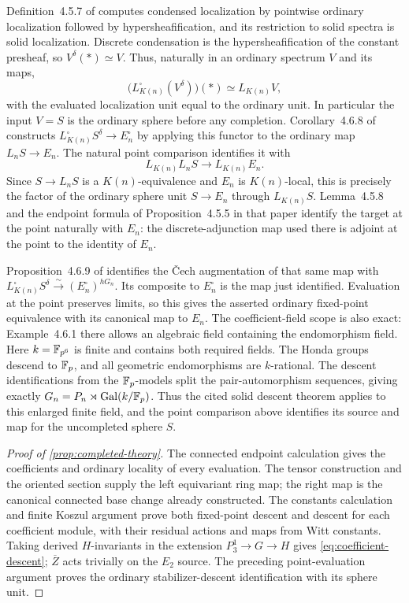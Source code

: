 Definition~4.5.7 of \cite{BMR2026} computes condensed localization by
pointwise ordinary localization followed by hypersheafification, and its
restriction to solid spectra is solid localization. Discrete condensation
is the hypersheafification of the constant presheaf, so
\(V^\delta(*)\simeq V\). Thus, naturally in an ordinary spectrum \(V\)
and its maps,
\[
 \bigl(L_{K(n)}^\square(V^\delta)\bigr)(*)\simeq L_{K(n)}V,
\]
with the evaluated localization unit equal to the ordinary unit.
In particular the input \(V=S\) is the ordinary sphere before any
completion. Corollary~4.6.8 of \cite{BMR2026} constructs
\(L_{K(n)}^\square S^\delta\to E_n^\square\) by applying this functor
to the ordinary map \(L_nS\to E_n\). The natural point comparison
identifies it with
\[
 L_{K(n)}L_nS\longrightarrow L_{K(n)}E_n.
\]
Since \(S\to L_nS\) is a \(K(n)\)-equivalence and \(E_n\) is
\(K(n)\)-local, this is precisely the factor of the ordinary sphere
unit \(S\to E_n\) through \(L_{K(n)}S\). Lemma~4.5.8 and the endpoint
formula of Proposition~4.5.5 in that paper identify the target at the
point naturally with \(E_n\): the discrete-adjunction map used there is
adjoint at the point to the identity of \(E_n\).

Proposition~4.6.9 of \cite{BMR2026} identifies the \v Cech augmentation
of that same map with
\(L_{K(n)}^\square S^\delta\xrightarrow{\sim}(E_n^\square)^{hG_n}\).
Its composite to \(E_n^\square\) is the map just identified. Evaluation
at the point preserves limits, so this gives the asserted ordinary
fixed-point equivalence with its canonical map to \(E_n\).
The coefficient-field scope is also exact: Example~4.6.1 there allows an
algebraic field containing the endomorphism field. Here
\(k=\mathbb F_{p^6}\) is finite and contains both required fields. The Honda
groups descend to \(\mathbb F_p\), and all geometric endomorphisms are
\(k\)-rational. The descent identifications from the \(\mathbb F_p\)-models split
the pair-automorphism sequences, giving exactly
\(G_n=P_n\rtimes\operatorname{Gal}(k/\mathbb F_p)\). Thus the cited solid descent theorem
applies to this enlarged finite field, and the point comparison above
identifies its source and map for the uncompleted sphere \(S\).

\begin{proof}[Proof of \cref{prop:completed-theory}]
The connected endpoint calculation gives the coefficients and ordinary
locality of every evaluation. The tensor construction and the oriented
section supply the left equivariant ring map; the right map is the
canonical connected base change already constructed.
The constants calculation and finite Koszul
argument prove both fixed-point descent and descent for each coefficient
module, with their residual actions and maps from Witt constants.
Taking derived \(H\)-invariants in the extension
\(P_3^1\to G\to H\) gives \eqref{eq:coefficient-descent};
\(\overline Z\) acts trivially on the \(E_2\) source.
The preceding point-evaluation argument proves the ordinary
stabilizer-descent identification with its sphere unit.
\end{proof}

